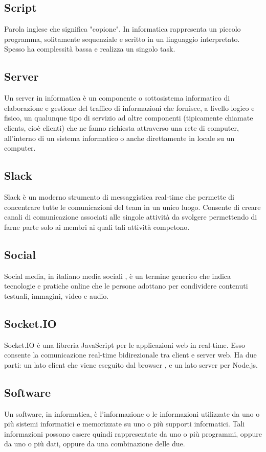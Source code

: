 \subsection{Script}
Parola inglese che significa "copione". In informatica rappresenta un piccolo
programma, solitamente sequenziale e scritto in un linguaggio interpretato.
Spesso ha complessità bassa e realizza un singolo task.

\subsection{Server}
Un server in informatica è un componente o sottosistema informatico di elaborazione e gestione del traffico di informazioni che fornisce, a livello logico e fisico, un qualunque tipo di servizio ad altre componenti (tipicamente chiamate clients, cioè clienti) che ne fanno richiesta attraverso una rete di computer, all'interno di un sistema informatico o anche direttamente in locale su un computer.

\subsection{Slack}
Slack è un moderno strumento di messaggistica real-time che permette di concentrare tutte le comunicazioni del team in un unico luogo.
Consente di creare canali di comunicazione associati alle singole attività da svolgere permettendo di farne parte solo ai membri ai quali tali attività competono.

\subsection{Social}
Social media, in italiano media sociali , è un termine generico che indica tecnologie e pratiche online che le persone adottano per condividere contenuti testuali, immagini, video e audio.

\subsection{Socket.IO}
Socket.IO è una libreria JavaScript per le applicazioni web in real-time. Esso consente la comunicazione real-time bidirezionale tra client e server web. Ha due parti: un lato client che viene eseguito dal browser , e un lato server per Node.js.

\subsection{Software}
Un software, in informatica, è l'informazione o le informazioni utilizzate da uno o più
sistemi informatici e memorizzate su uno o più supporti informatici. Tali informazioni possono
essere quindi rappresentate da uno o più programmi, oppure da uno o più dati, oppure
da una combinazione delle due.

